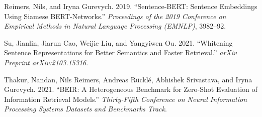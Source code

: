 \documentclass[
  11pt,
  letterpaper,
]{article}
\newlength{\cslhangindent}
\newenvironment{CSLReferences}[2] %
 {\begin{list}{}{%
  \setlength{\itemindent}{0pt}
  \setlength{\leftmargin}{0pt}
  \setlength{\parsep}{0pt}
  \ifodd #1
   \setlength{\leftmargin}{\cslhangindent}
   \setlength{\itemindent}{-1\cslhangindent}
  \fi
  \setlength{\itemsep}{#2\baselineskip}}}
 {\end{list}}
\begin{document}
\begin{CSLReferences}{1}{1}
Reimers, Nils, and Iryna Gurevych. 2019. {``Sentence-BERT: Sentence
Embeddings Using Siamese BERT-Networks.''} \emph{Proceedings of the 2019
Conference on Empirical Methods in Natural Language Processing (EMNLP)},
3982--92.

Su, Jianlin, Jiarun Cao, Weijie Liu, and Yangyiwen Ou. 2021.
{``Whitening Sentence Representations for Better Semantics and Faster
Retrieval.''} \emph{arXiv Preprint arXiv:2103.15316}.

Thakur, Nandan, Nils Reimers, Andreas Rücklé, Abhishek Srivastava, and
Iryna Gurevych. 2021. {``{BEIR}: A Heterogeneous Benchmark for Zero-Shot
Evaluation of Information Retrieval Models.''} \emph{Thirty-Fifth
Conference on Neural Information Processing Systems Datasets and
Benchmarks Track}.

\end{CSLReferences}
\end{document}
